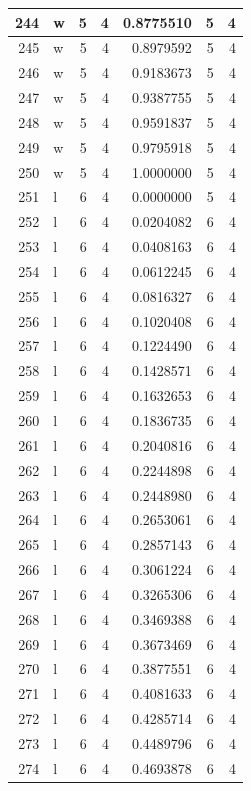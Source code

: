 \documentclass[
  letterpaper,
  DIV=11,
  numbers=noendperiod]{scrreprt}
\begin{document}
\begin{table}
\begin{tabular}[t]{r|l|r|r|r|r|r}
\hline
244 & w & 5 & 4 & 0.8775510 & 5 & 4\\
\hline
245 & w & 5 & 4 & 0.8979592 & 5 & 4\\
\hline
246 & w & 5 & 4 & 0.9183673 & 5 & 4\\
\hline
247 & w & 5 & 4 & 0.9387755 & 5 & 4\\
\hline
248 & w & 5 & 4 & 0.9591837 & 5 & 4\\
\hline
249 & w & 5 & 4 & 0.9795918 & 5 & 4\\
\hline
250 & w & 5 & 4 & 1.0000000 & 5 & 4\\
\hline
251 & l & 6 & 4 & 0.0000000 & 5 & 4\\
\hline
252 & l & 6 & 4 & 0.0204082 & 6 & 4\\
\hline
253 & l & 6 & 4 & 0.0408163 & 6 & 4\\
\hline
254 & l & 6 & 4 & 0.0612245 & 6 & 4\\
\hline
255 & l & 6 & 4 & 0.0816327 & 6 & 4\\
\hline
256 & l & 6 & 4 & 0.1020408 & 6 & 4\\
\hline
257 & l & 6 & 4 & 0.1224490 & 6 & 4\\
\hline
258 & l & 6 & 4 & 0.1428571 & 6 & 4\\
\hline
259 & l & 6 & 4 & 0.1632653 & 6 & 4\\
\hline
260 & l & 6 & 4 & 0.1836735 & 6 & 4\\
\hline
261 & l & 6 & 4 & 0.2040816 & 6 & 4\\
\hline
262 & l & 6 & 4 & 0.2244898 & 6 & 4\\
\hline
263 & l & 6 & 4 & 0.2448980 & 6 & 4\\
\hline
264 & l & 6 & 4 & 0.2653061 & 6 & 4\\
\hline
265 & l & 6 & 4 & 0.2857143 & 6 & 4\\
\hline
266 & l & 6 & 4 & 0.3061224 & 6 & 4\\
\hline
267 & l & 6 & 4 & 0.3265306 & 6 & 4\\
\hline
268 & l & 6 & 4 & 0.3469388 & 6 & 4\\
\hline
269 & l & 6 & 4 & 0.3673469 & 6 & 4\\
\hline
270 & l & 6 & 4 & 0.3877551 & 6 & 4\\
\hline
271 & l & 6 & 4 & 0.4081633 & 6 & 4\\
\hline
272 & l & 6 & 4 & 0.4285714 & 6 & 4\\
\hline
273 & l & 6 & 4 & 0.4489796 & 6 & 4\\
\hline
274 & l & 6 & 4 & 0.4693878 & 6 & 4\\

\end{tabular}
\end{table}
\end{document}
